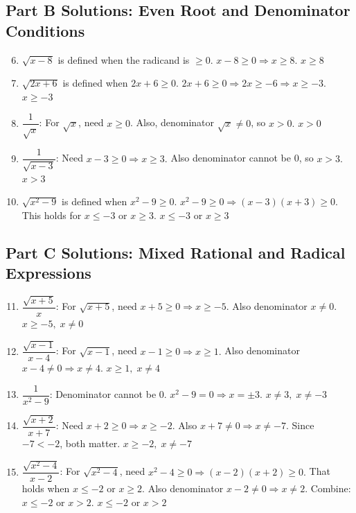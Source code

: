 \documentclass[14pt]{extarticle}
\begin{document}
\subsection*{Part B Solutions: Even Root and Denominator Conditions}
\begin{enumerate}
  \setcounter{enumi}{5}
  \item \(\sqrt{x - 8}\) is defined when the radicand is \(\ge 0\).  
  \(x - 8 \ge 0 \Rightarrow x \ge 8.\)  
  \(\boxed{x \ge 8}\)

  \item \(\sqrt{2x + 6}\) is defined when \(2x + 6 \ge 0.\)  
  \(2x + 6 \ge 0 \Rightarrow 2x \ge -6 \Rightarrow x \ge -3.\)  
  \(\boxed{x \ge -3}\)

  \item \(\dfrac{1}{\sqrt{x}}\):  
  For \(\sqrt{x}\), need \(x \ge 0\).  
  Also, denominator \(\sqrt{x} \ne 0\), so \(x > 0.\)  
  \(\boxed{x > 0}\)

  \item \(\dfrac{1}{\sqrt{x - 3}}\):  
  Need \(x - 3 \ge 0 \Rightarrow x \ge 3.\)  
  Also denominator cannot be 0, so \(x > 3.\)  
  \(\boxed{x > 3}\)

  \item \(\sqrt{x^2 - 9}\) is defined when \(x^2 - 9 \ge 0.\)  
  \(x^2 - 9 \ge 0 \Rightarrow (x - 3)(x + 3) \ge 0.\)  
  This holds for \(x \le -3\) or \(x \ge 3.\)  
  \(\boxed{x \le -3 \text{ or } x \ge 3}\)
\end{enumerate}

\subsection*{Part C Solutions: Mixed Rational and Radical Expressions}
\begin{enumerate}
  \setcounter{enumi}{10}
  \item \(\dfrac{\sqrt{x + 5}}{x}\):  
  For \(\sqrt{x+5}\), need \(x + 5 \ge 0 \Rightarrow x \ge -5.\)  
  Also denominator \(x \ne 0.\)  
  \(\boxed{x \ge -5,\; x \ne 0}\)

  \item \(\dfrac{\sqrt{x - 1}}{x - 4}\):  
  For \(\sqrt{x-1}\), need \(x - 1 \ge 0 \Rightarrow x \ge 1.\)  
  Also denominator \(x - 4 \ne 0 \Rightarrow x \ne 4.\)  
  \(\boxed{x \ge 1,\; x \ne 4}\)

  \item \(\dfrac{1}{x^2 - 9}\):  
  Denominator cannot be 0.  
  \(x^2 - 9 = 0 \Rightarrow x = \pm 3.\)  
  \(\boxed{x \ne 3,\; x \ne -3}\)

  \item \(\dfrac{\sqrt{x + 2}}{x + 7}\):  
  Need \(x + 2 \ge 0 \Rightarrow x \ge -2.\)  
  Also \(x + 7 \ne 0 \Rightarrow x \ne -7.\)  
  Since \(-7 < -2\), both matter.  
  \(\boxed{x \ge -2,\; x \ne -7}\)

  \item \(\dfrac{\sqrt{x^2 - 4}}{x - 2}\):  
  For \(\sqrt{x^2 - 4}\), need \(x^2 - 4 \ge 0 \Rightarrow (x-2)(x+2) \ge 0.\)  
  That holds when \(x \le -2\) or \(x \ge 2.\)  
  Also denominator \(x - 2 \ne 0 \Rightarrow x \ne 2.\)  
  Combine: \(x \le -2\) or \(x > 2.\)  
  \(\boxed{x \le -2 \text{ or } x > 2}\)
\end{enumerate}
\end{document}
